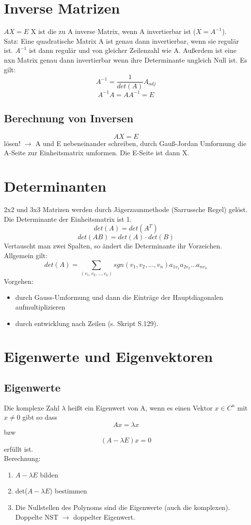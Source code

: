 \documentclass[12pt,a4paper]{article}
\begin{document}
\section{Inverse Matrizen}
$AX = E$ X ist die zu A inverse Matrix, wenn A invertierbar ist ($X = A^{-1}$).\\
Satz: Eine quadratische Matrix A ist genau dann invertierbar, wenn sie regulär ist. $A^{-1}$ ist dann regulär und von gleicher Zeilenzahl wie A. Außerdem ist eine nxn Matrix genau dann invertierbar wenn ihre Determinante ungleich Null ist. Es gilt:
\[A^{-1} = \frac{1}{det(A)}A_{adj}\]
\[A^{-1} A = AA^{-1} = E\]


\subsection{Berechnung von Inversen}
\[AX = E\] lösen!
$\rightarrow$ A und E nebeneinander schreiben, durch Gauß-Jordan Umformung die A-Seite zur Einheitsmatrix umformen. Die E-Seite ist dann X.\\

\section{Determinanten}
2x2 und 3x3 Matrizen werden durch Jägerzaunmethode (Sarrussche Regel) gelöst. Die Determinante der Einheitsmatrix ist 1.\\
\[det(A) = det(A^T)\]
\[det(AB) = det(A) \cdot det(B)\]
Vertauscht man zwei Spalten, so ändert die Determinante ihr Vorzeichen.\\
Allgemein gilt: \[det(A) = \sum_{(v_1,v_2,...,v_n)} sgn(v_1,v_2,...,v_n) a_{1v_1}a_{2v_2}...a_{nv_n}\]
Vorgehen:

\begin{itemize}
\item durch Gauss-Umformung und dann die Einträge der Hauptdiagonalen aufmultiplizieren
\item durch entwicklung nach Zeilen (s. Skript S.129).
\end{itemize}

\section{Eigenwerte und Eigenvektoren}
\subsection{Eigenwerte}
Die komplexe Zahl $\lambda$ heißt ein Eigenwert von A, wenn es einen Vektor $ x \in C^n$ mit $x \neq 0$ gibt so dass\\
\[Ax=\lambda x\] bzw \[(A-\lambda E)x=0\]
erfüllt ist.\\
Berechnung:\\
\begin{enumerate}
\item
$A-\lambda E$ bilden
\item
det($A-\lambda E$) bestimmen
\item
Die Nullstellen des Polynoms sind die Eigenwerte (auch die komplexen). Doppelte NST $\rightarrow$ doppelter Eigenwert.
\end{enumerate}
\end{document}

